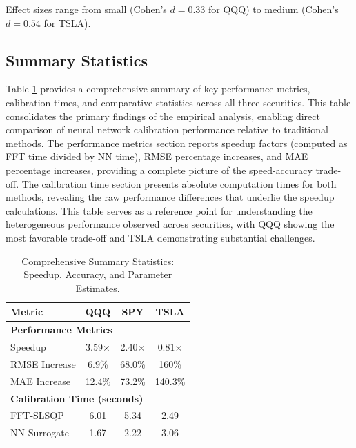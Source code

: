 \documentclass[12pt,a4paper]{article}
\begin{document}
Effect sizes range from small (Cohen's $d = 0.33$ for QQQ) to medium (Cohen's $d = 0.54$ for TSLA).

\subsection{Summary Statistics}

Table \ref{tab:summary} provides a comprehensive summary of key performance metrics, calibration times, and comparative statistics across all three securities. This table consolidates the primary findings of the empirical analysis, enabling direct comparison of neural network calibration performance relative to traditional methods. The performance metrics section reports speedup factors (computed as FFT time divided by NN time), RMSE percentage increases, and MAE percentage increases, providing a complete picture of the speed-accuracy trade-off. The calibration time section presents absolute computation times for both methods, revealing the raw performance differences that underlie the speedup calculations. This table serves as a reference point for understanding the heterogeneous performance observed across securities, with QQQ showing the most favorable trade-off and TSLA demonstrating substantial challenges.

\begin{table}[H]

\centering

\caption{Comprehensive Summary Statistics: Speedup, Accuracy, and Parameter Estimates.}

\label{tab:summary}

\begin{tabular}{lccc}

\toprule

\textbf{Metric} & \textbf{QQQ} & \textbf{SPY} & \textbf{TSLA} \\

\midrule

\multicolumn{4}{l}{\textbf{Performance Metrics}} \\

Speedup & 3.59$\times$ & 2.40$\times$ & 0.81$\times$ \\

RMSE Increase & 6.9\% & 68.0\% & 160\% \\

MAE Increase & 12.4\% & 73.2\% & 140.3\% \\

\midrule

\multicolumn{4}{l}{\textbf{Calibration Time (seconds)}} \\

FFT-SLSQP & 6.01 & 5.34 & 2.49 \\

NN Surrogate & 1.67 & 2.22 & 3.06 \\

\bottomrule

\end{tabular}

\end{table}
\end{document}
